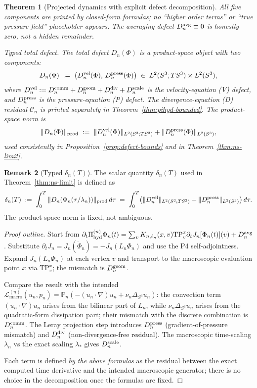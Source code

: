 \documentclass[11pt, a4paper]{amsart}
\newtheorem{theorem}{Theorem}[section]
\theoremstyle{definition}
\newtheorem{remark}[theorem]{Remark}
\newcommand{\Pihyd}{\Pi_{\mathrm{hyd}}}
\newcommand{\Lmacro}{\mathcal L_{\mathrm{macro}}}
\newcommand{\LapS}{\Delta_{S^3}}
\newcommand{\Projn}{\mathbb P_n}
\begin{document}
\begin{theorem}[Projected dynamics with explicit defect decomposition]
All five components are printed by closed-form formulas; no
``higher order terms'' or ``true pressure field'' placeholder
appears. The averaging defect $D_n^{\rm avg} \equiv 0$ is
honestly zero, not a hidden remainder.

\emph{Typed total defect.} The total defect $D_n(\Phi)$ is a
\emph{product-space object} with two components:
\[
  D_n(\Phi) \;:=\; \bigl(D_n^{\rm vel}(\Phi),\,
    D_n^{\rm press}(\Phi)\bigr)
  \;\in\; L^2(S^3; TS^3) \times L^2(S^3),
\]
where $D_n^{\rm vel} := D_n^{\rm comm} + D_n^{\rm geom} +
D_n^{\rm div} + D_n^{\rm scale}$ is the velocity-equation (V)
defect, and $D_n^{\rm press}$ is the pressure-equation (P)
defect. The divergence-equation (D) residual $\mathcal C_n$ is
printed separately in Theorem~\ref{thm:pihyd-bounded}. The
\emph{product-space norm} is
\[
  \|D_n(\Phi)\|_{\rm prod} \;:=\; \|D_n^{\rm vel}(\Phi)\|_
    {L^2(S^3; TS^3)} + \|D_n^{\rm press}(\Phi)\|_{L^2(S^3)},
\]
used consistently in Proposition~\ref{prop:defect-bounds} and
in Theorem~\ref{thm:ns-limit}.
\end{theorem}

\begin{remark}[Typed $\delta_n(T)$]
\label{rmk:delta-typed}
The scalar quantity $\delta_n(T)$ used in
Theorem~\ref{thm:ns-limit} is defined as
\[
  \delta_n(T) \;:=\; \int_0^T \|D_n(\Phi_n(\tau/\lambda_n))\|
    _{\rm prod}\,d\tau
  \;=\; \int_0^T \bigl(\|D_n^{\rm vel}\|_{L^2(S^3; TS^3)} +
  \|D_n^{\rm press}\|_{L^2(S^3)}\bigr)\,d\tau.
\]
The product-space norm is fixed, not ambiguous.
\end{remark}

\begin{proof}[Proof outline]
Start from $\partial_t \Pihyd^{(n)} \Phi_n(t) = \sum_v
K_{n,\ell_n}(x, v) \mathrm{TP}_v^x \partial_t J_n[\Phi_n(t)](v)
+ D_n^{\rm avg}$. Substitute $\partial_t J_n = J_n(\dot \Phi_n)
= -J_n(L_n \Phi_n)$ and use the P4 self-adjointness. Expand
$J_n(L_n \Phi_n)$ at each vertex $v$ and transport to the
macroscopic evaluation point $x$ via $\mathrm{TP}_v^x$; the
mismatch is $D_n^{\rm geom}$.

Compare the result with the intended $\Lmacro^{(n)}(u_n, p_n) =
\Projn(-(u_n \cdot \nabla) u_n + \nu_n \LapS u_n)$: the
convection term $(u_n \cdot \nabla) u_n$ arises from the
bilinear part of $L_n$, while $\nu_n \LapS u_n$ arises from
the quadratic-form dissipation part; their mismatch with the
discrete combination is $D_n^{\rm comm}$. The Leray projection
step introduces $D_n^{\rm press}$ (gradient-of-pressure mismatch)
and $D_n^{\rm div}$ (non-divergence-free residual). The
macroscopic time-scaling $\lambda_n$ vs the exact scaling
$\lambda_\ast$ gives $D_n^{\rm scale}$.

Each term is defined \emph{by the above formulas} as the
residual between the exact computed time derivative and the
intended macroscopic generator; there is no choice in the
decomposition once the formulas are fixed.
\end{proof}
\end{document}
